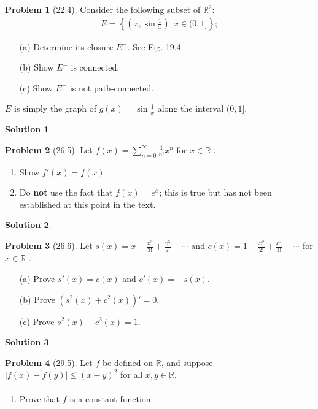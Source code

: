 \documentclass[12pt]{article}
\theoremstyle{definition} %
\newtheorem{solution}{Solution}
\newtheorem{problem}{Problem}
\theoremstyle{plain} %
\begin{document}
\begin{problem}[22.4]
        Consider the following subset of $\mathbb{R}^2$: 
    \begin{align}
        E = \left\{ \left( x, \sin\frac{1}{x} \right) : x \in (0, 1] \right\};
    \end{align}
    \begin{enumerate}
        \item[(a)] Determine its closure $ E^- $. See Fig. 19.4.
        \item[(b)] Show $ E^- $ is connected.
        \item[(c)] Show $ E^- $ is not path-connected.
    \end{enumerate}
        $E$ is simply the graph of $g(x) = \sin\frac{1}{x}$ along the interval $(0, 1]$.
\end{problem}
\begin{solution}
\end{solution}
\begin{problem}[26.5]
        Let $f(x) = \sum_{n=0}^\infty \frac{1}{n!} x^n $ for $x \in \mathbb{R}$ .
    \begin{enumerate}
        \item Show $ f'(x) = f(x) $.
        \item Do \textbf{not} use the fact that $ f(x) = e^x $; this is true but has not been established at this point in the text.
    \end{enumerate}
\end{problem}
\begin{solution}
    
\end{solution}
\begin{problem}[26.6]
   Let $s(x) = x - \frac{x^3}{3!} + \frac{x^5}{5!} - \cdots$ and $c(x) = 1 - \frac{x^2}{2!} + \frac{x^4}{4!} - \cdots$ for $x \in \mathbb{R}$ .
    \begin{enumerate}
        \item[(a)] Prove $ s'(x) = c(x) $ and $ c'(x) = -s(x) $.
        \item[(b)] Prove $ (s^2(x) + c^2(x))' = 0 $.
        \item[(c)] Prove $ s^2(x) + c^2(x) = 1 $.
    \end{enumerate}
\end{problem}
\begin{solution}
    
\end{solution}
\begin{problem}[29.5]
    Let $f$ be defined on $\mathbb{R}$, and suppose $|f(x) - f(y)| \leq (x - y)^2$ for all $x, y  \in \mathbb{R}$.
    \begin{align}
    \end{align}
    \begin{enumerate}
        \item Prove that $ f $ is a constant function.
    \end{enumerate}
\end{problem}
\end{document}
